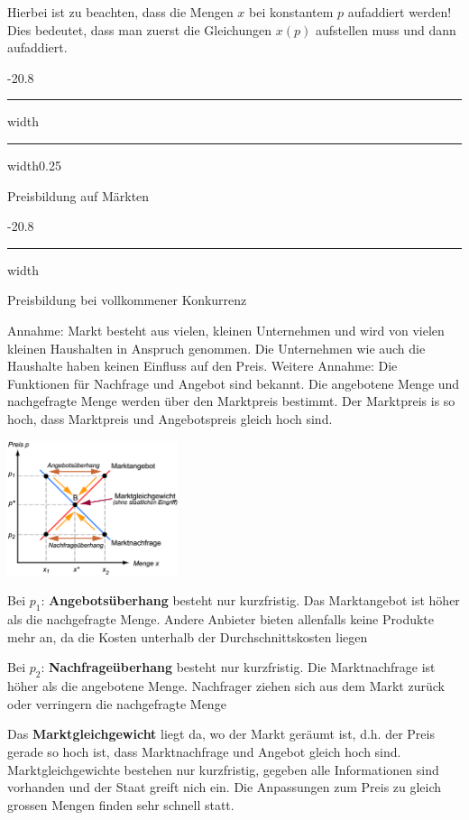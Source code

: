 \documentclass[9pt, landscape, fleqn]{scrartcl}
\makeatletter
\renewcommand{\subsection}{\@startsection{subsection}{1}{0mm}%
{-2\baselineskip}{0.8\baselineskip}%
{\hrule depth 0.2pt width\columnwidth\hrule depth0.75pt
width0.25\columnwidth\vspace*{1.2em}\large\bfseries\rmfamily}}
\renewcommand{\subsubsection}{\@startsection{subsubsection}{1}{0mm}%
{-2\baselineskip}{0.8\baselineskip}%
{\hrule depth 0.2pt width\columnwidth\vspace*{1.2em}\normalsize\bfseries\rmfamily}}
\makeatother
\begin{document}
\begin{multicols*}{3}
Hierbei ist zu beachten, dass die Mengen $x$ bei konstantem $p$ aufaddiert werden! Dies bedeutet, dass man zuerst die Gleichungen $x(p)$ aufstellen muss und dann aufaddiert.

\subsection{Preisbildung auf Märkten}

\subsubsection{Preisbildung bei vollkommener Konkurrenz}

Annahme: Markt besteht aus vielen, kleinen Unternehmen und wird von vielen kleinen Haushalten in Anspruch genommen. Die Unternehmen wie auch die Haushalte haben keinen Einfluss auf den Preis. Weitere Annahme: Die Funktionen für Nachfrage und Angebot sind bekannt.
Die angebotene Menge und nachgefragte Menge werden über den Marktpreis bestimmt. Der Marktpreis is so hoch, dass Marktpreis und Angebotspreis gleich hoch sind. 

\begin{center}
    \includegraphics[width=5cm]{Marktgleichgewicht_1.png}
\end{center}

Bei $p_1$: \textbf{Angebotsüberhang} besteht nur kurzfristig. Das Marktangebot ist höher als die nachgefragte Menge. Andere Anbieter bieten allenfalls keine Produkte mehr an, da die Kosten unterhalb der Durchschnittskosten liegen\newline 

Bei $p_2$: \textbf{Nachfrageüberhang} besteht nur kurzfristig. Die Marktnachfrage ist höher als die angebotene Menge. Nachfrager ziehen sich aus dem Markt zurück oder verringern die nachgefragte Menge \newline 

Das \textbf{Marktgleichgewicht} liegt da, wo der Markt geräumt ist, d.h. der Preis gerade so hoch ist, dass Marktnachfrage und Angebot gleich hoch sind. Marktgleichgewichte bestehen nur kurzfristig, gegeben alle Informationen sind vorhanden und der Staat greift nich ein.
Die Anpassungen zum Preis zu gleich grossen Mengen finden sehr schnell statt. 



\end{multicols*}
\end{document}
